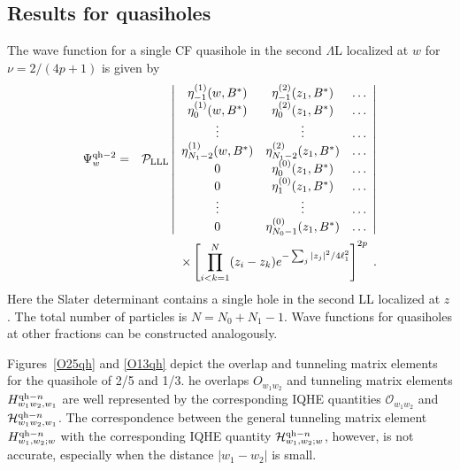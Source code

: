 \documentclass[twocolumn,floatfix,prb,aps,showpacs]{revtex4-2}
\begin{document}
\begin{appendix}
\section{Results for quasiholes}
\label{additionalQPQH}
The wave function for a single CF quasihole in the second $\Lambda$L localized at $w$ for $\nu=2/(4p+1)$ is given by
\begin{eqnarray}
\Psi^{\rm qh-2}_{w} &=& {\cal P}_{\rm LLL} 
\left|\begin{array}{ccc}
\eta^{(1)}_{-1}(w,B^*) & \eta^{(2)}_{-1}(z_1,B^*) &\ldots\\
\eta^{(1)}_{0}(w,B^*) & \eta^{(2)}_{0}(z_1,B^*) &\ldots\\
\vdots&\vdots&\ldots \\
\eta^{(1)}_{N_1-2}(w,B^*) & \eta^{(2)}_{N_1-2}(z_1,B^*) &\ldots\\
0 & \eta^{(0)}_{0}(z_1,B^*) &\ldots\\
0 & \eta^{(0)}_{1}(z_1,B^*) &\ldots\\
\vdots&\vdots&\ldots \\
0 & \eta^{(0)}_{N_0-1}(z_1,B^*) &\ldots\\
\end{array}
\right| \nonumber \\
& & \;\;\;\;\times  \left[\prod_{i<k=1}^N(z_i-z_k) e^{-\sum_j|z_j|^2/4\ell_1^2}\right]^{2p}\;.
\label{CFQH}
\end{eqnarray}
Here the Slater determinant contains a single hole in the second LL localized at $z$.  The total number of particles is $N=N_0+N_1-1$.  Wave functions for quasiholes at other fractions can be constructed analogously. 

Figures~\ref{O25qh} and \ref{O13qh} depict the overlap and tunneling matrix elements for the quasihole of 2/5 and 1/3. he overlaps $O_{w_1w_2}$ and tunneling matrix elements $H^{{\rm qh}-n}_{w_1w_2,w_1}$ are well represented by the corresponding IQHE quantities $\mathcal{O}_{w_1w_2}$ and $\mathcal{H}^{{\rm qh}-n}_{w_1w_2,w_1}$. The correspondence between the general tunneling matrix element $H^{{\rm qh}-n}_{w_1,w_2;w}$ with the corresponding IQHE quantity $\mathcal{H}^{{\rm qh}-n}_{w_1,w_2;w}$, however, is not accurate, especially when the distance $|w_1-w_2|$ is small. 


\end{appendix}
\end{document}
